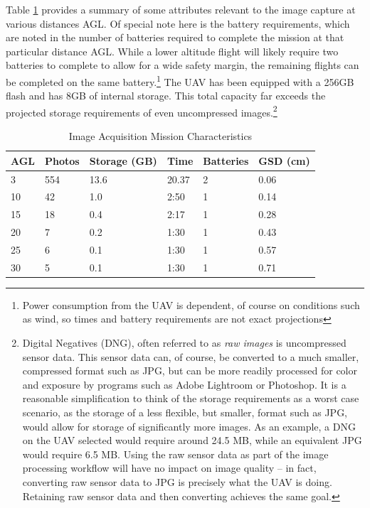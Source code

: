 \documentclass[12pt]{article}
\begin{document}
Table \ref{tab:acquisition} provides a summary of some attributes relevant to the image capture at various distances AGL.  Of special note here is the battery requirements, which are noted in the number of batteries required to complete the mission at that particular distance AGL. While a lower altitude flight will likely require two batteries to complete to allow for a wide safety margin, the remaining flights can be completed on the same battery.\footnote{Power consumption from the UAV is dependent, of course on conditions such as wind, so times and battery requirements are not exact projections}
The UAV has been equipped with a 256GB flash and has 8GB of internal storage. This total capacity far exceeds the projected storage requirements of even uncompressed images.\footnote{Digital Negatives (DNG), often referred to as \textit{raw images} is uncompressed sensor data. This sensor data can, of course, be converted to a much smaller, compressed format such as JPG, but can be more readily processed for color and exposure by programs such as Adobe Lightroom or Photoshop. It is a reasonable simplification to think of the storage requirements as a worst case scenario, as the storage of a less flexible, but smaller, format such as JPG, would allow for storage of significantly more images.  As an example, a DNG on the UAV selected would require around 24.5 MB, while an equivalent JPG would require 6.5 MB. Using the raw sensor data as part of the image processing workflow will have no impact on image quality -- in fact, converting raw sensor data to JPG is precisely what the UAV is doing. Retaining raw sensor data and then converting achieves the same goal.}
\begin{table}[ht]
	\centering
    \caption{Image Acquisition Mission Characteristics}
    \label{tab:acquisition}
    \begin{tabular}[t]{llllll} 
		\textbf{AGL} & \textbf{Photos} &\textbf{Storage (GB)} & \textbf{Time} & \textbf{Batteries} & \textbf{GSD (cm)}\\
		\midrule
		      3 & 554 & 13.6 & 20.37 & 2 & 0.06 \\
		      10 & 42 & 1.0  & 2:50 & 1 & 0.14 \\
		     15 & 18 & 0.4 & 2:17 & 1 & 0.28 \\
		     20 & 7 & 0.2 & 1:30 & 1 & 0.43 \\
		     25 & 6 & 0.1 & 1:30 &1 & 0.57 \\
		     30 & 5 & 0.1 & 1:30 & 1 & 0.71
    \end{tabular}
\end{table}
\end{document}
